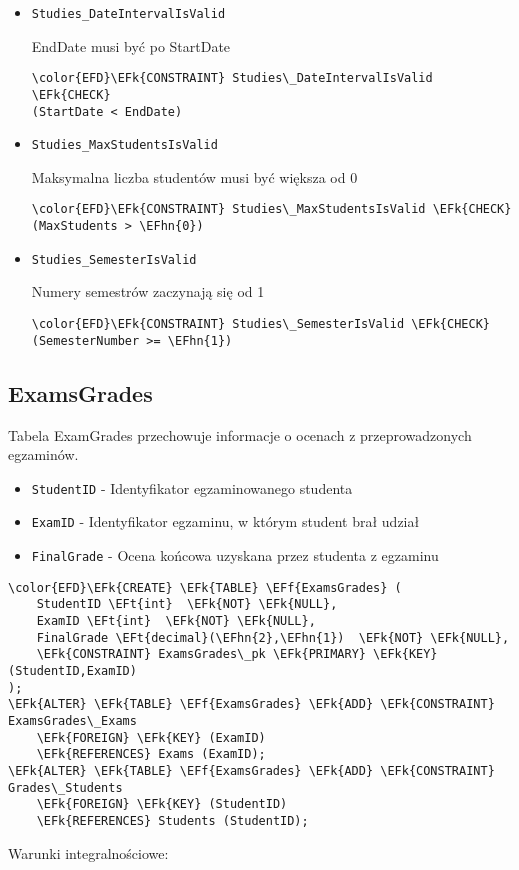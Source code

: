 \documentclass[11pt]{article}
\newcommand{\EFk}[1]{\textcolor{EFk}{\textbf{#1}}} %
\newcommand{\EFf}[1]{\textcolor{EFf}{#1}} %
\newcommand{\EFt}[1]{\textcolor{EFt}{\textbf{#1}}} %
\newcommand{\EFhn}[1]{\textcolor{EFhn}{#1}} %
\begin{document}
\begin{itemize}
\item \texttt{Studies\_DateIntervalIsValid}

EndDate musi być po StartDate
\begin{Code}
\begin{Verbatim}
\color{EFD}\EFk{CONSTRAINT} Studies\_DateIntervalIsValid \EFk{CHECK}
(StartDate < EndDate)
\end{Verbatim}
\end{Code}
\item \texttt{Studies\_MaxStudentsIsValid}

Maksymalna liczba studentów musi być większa od 0
\begin{Code}
\begin{Verbatim}
\color{EFD}\EFk{CONSTRAINT} Studies\_MaxStudentsIsValid \EFk{CHECK}
(MaxStudents > \EFhn{0})
\end{Verbatim}
\end{Code}
\item \texttt{Studies\_SemesterIsValid}

Numery semestrów zaczynają się od 1
\begin{Code}
\begin{Verbatim}
\color{EFD}\EFk{CONSTRAINT} Studies\_SemesterIsValid \EFk{CHECK}
(SemesterNumber >= \EFhn{1})
\end{Verbatim}
\end{Code}
\end{itemize}
\subsection{ExamsGrades}
\label{sec:org5915679}
Tabela ExamGrades przechowuje informacje o ocenach z przeprowadzonych egzaminów.
\begin{itemize}
\item \texttt{StudentID} - Identyfikator egzaminowanego studenta
\item \texttt{ExamID} - Identyfikator egzaminu, w którym student brał udział
\item \texttt{FinalGrade} - Ocena końcowa uzyskana przez studenta z egzaminu
\end{itemize}
\begin{Code}
\begin{Verbatim}
\color{EFD}\EFk{CREATE} \EFk{TABLE} \EFf{ExamsGrades} (
    StudentID \EFt{int}  \EFk{NOT} \EFk{NULL},
    ExamID \EFt{int}  \EFk{NOT} \EFk{NULL},
    FinalGrade \EFt{decimal}(\EFhn{2},\EFhn{1})  \EFk{NOT} \EFk{NULL},
    \EFk{CONSTRAINT} ExamsGrades\_pk \EFk{PRIMARY} \EFk{KEY}  (StudentID,ExamID)
);
\EFk{ALTER} \EFk{TABLE} \EFf{ExamsGrades} \EFk{ADD} \EFk{CONSTRAINT} ExamsGrades\_Exams
    \EFk{FOREIGN} \EFk{KEY} (ExamID)
    \EFk{REFERENCES} Exams (ExamID);
\EFk{ALTER} \EFk{TABLE} \EFf{ExamsGrades} \EFk{ADD} \EFk{CONSTRAINT} Grades\_Students
    \EFk{FOREIGN} \EFk{KEY} (StudentID)
    \EFk{REFERENCES} Students (StudentID);
\end{Verbatim}
\end{Code}
Warunki integralnościowe:
\end{document}
